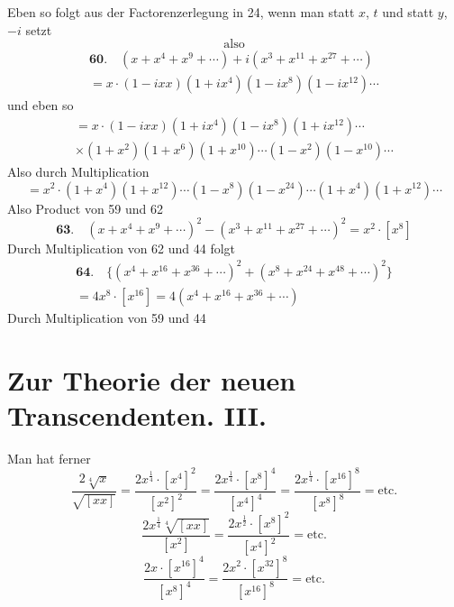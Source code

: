 \documentclass[10pt,a4paper]{article}
\begin{document}
Eben so folgt aus der Factorenzerlegung in 24, wenn man statt $x$, $t$ und statt $y$, $-i$ setzt
%
\begin{equation*}
\text{also}
\end{equation*}
%
\begin{multline*}
\textbf{60.} \quad (x + x^4 + x^9 + \cdots) + i(x^3 + x^{11} + x^{27} + \cdots) \\
= x \cdot (1 - ixx)(1 + ix^4)(1 - ix^8)(1 - ix^{12}) \cdots
\end{multline*}
%
und eben so
%
\begin{multline*}
= x \cdot (1 - ixx)(1 + ix^4)(1 - ix^8)(1 + ix^{12}) \cdots \\
\times (1 + x^2)(1 + x^6)(1 + x^{10}) \cdots (1 - x^2)(1 - x^{10}) \cdots
\end{multline*}
%
Also durch Multiplication
%
\begin{equation*}
= x^2 \cdot (1 + x^4)(1 + x^{12}) \cdots (1 - x^8)(1 - x^{24}) \cdots (1 + x^4)(1 + x^{12}) \cdots
\end{equation*}
%
Also Product von 59 und 62
%
\begin{equation*}
\textbf{63.} \quad (x + x^4 + x^9 + \cdots)^2 - (x^3 + x^{11} + x^{27} + \cdots)^2 = x^2 \cdot [x^8]
\end{equation*}
%
Durch Multiplication von 62 und 44 folgt
%
\begin{multline*}
\textbf{64.} \quad \bigl\{(x^4 + x^{16} + x^{36} + \cdots)^2 + (x^8 + x^{24} + x^{48} + \cdots)^2\bigr\} \\
= 4x^8 \cdot [x^{16}] = 4(x^4 + x^{16} + x^{36} + \cdots)
\end{multline*}
%
Durch Multiplication von 59 und 44

\section*{Zur Theorie der neuen Transcendenten. III.}

Man hat ferner
%
\begin{equation*}
\frac{2\sqrt[4]{x}}{\sqrt{[xx]}} = \frac{2x^{\frac{1}{4}} \cdot [x^4]^2}{[x^2]^2} =
\frac{2x^{\frac{1}{4}} \cdot [x^8]^4}{[x^4]^4} = \frac{2x^{\frac{1}{4}} \cdot [x^{16}]^8}{[x^8]^8} = \text{etc.}
\end{equation*}
%
\begin{equation*}
\frac{2x^{\frac{1}{4}} \sqrt[4]{[xx]}}{[x^2]} =
\frac{2x^{\frac{1}{2}} \cdot [x^8]^2}{[x^4]^2} = \text{etc.}
\end{equation*}
%
\begin{equation*}
\frac{2x \cdot [x^{16}]^4}{[x^8]^4} = \frac{2x^2 \cdot [x^{32}]^8}{[x^{16}]^8} = \text{etc.}
\end{equation*}
\end{document}
